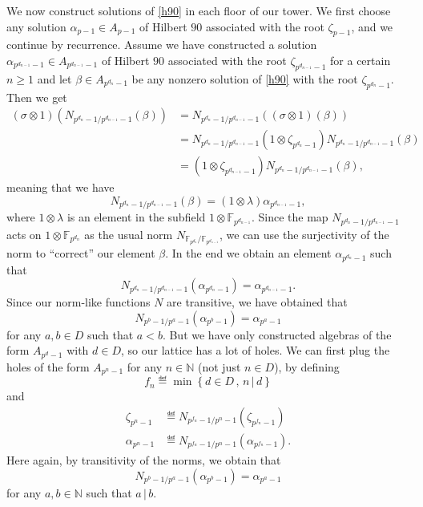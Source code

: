 \documentclass[a4paper,11pt]{article}
\begin{document}
We now construct solutions of \eqref{h90} in each floor of our
tower. We first choose any solution $\alpha_{p-1}\in A_{p-1}$ of Hilbert $90$
associated with the root $\zeta_{p-1}$, and we continue by recurrence. Assume we
have constructed a solution $\alpha_{p^{d_{n-1}}-1}\in A_{p^{d_{n-1}}-1}$ of
Hilbert $90$ associated with the root $\zeta_{p^{d_{n-1}}-1}$ for a certain
$n\geq1$ and let
$\beta\in A_{p^{d_n}-1}$ be any nonzero solution of \eqref{h90} with the root
$\zeta_{p^{d_n}-1}$.
Then we get
\begin{align*}
  (\sigma\otimes1)(N_{p^{d_n}-1/p^{d_{n-1}}-1}(\beta)) &= N_{p^{d_n}-1/p^{d_{n-1}}-1}((\sigma\otimes1)(\beta)) \\
  &= N_{p^{d_n}-1/p^{d_{n-1}}-1}(1\otimes\zeta_{p^{d_n}-1}) N_{p^{d_n}-1/p^{d_{n-1}}-1}(\beta) \\
  &= (1\otimes\zeta_{p^{d_{n-1}}-1})N_{p^{d_n}-1/p^{d_{n-1}}-1}(\beta),
\end{align*}
meaning that we have
\[
  N_{p^{d_n}-1/p^{d_{n-1}}-1}(\beta)=(1\otimes\lambda)\alpha_{p^{d_{n-1}}-1},
\]
where $1\otimes\lambda$ is an element in the subfield $1\otimes\mathbb{F}_{p^{d_{n-1}}}$. Since the map
$N_{p^{d_n}-1/p^{d_{n-1}}-1}$ acts on $1\otimes\mathbb{F}_{p^{d_n}}$ as the
usual norm $N_{\mathbb{F}_{p^{d_n}}/\mathbb{F}_{p^{d_{n-1}}}}$, we can use
the surjectivity of the norm to ``correct'' our element $\beta$. In the end we
obtain an element $\alpha_{p^{d_n}-1}$ such
that
\[
  N_{p^{d_n}-1/p^{d_{n-1}}-1}(\alpha_{p^{d_n}-1})=
  \alpha_{p^{d_{n-1}}-1}.
\]
Since our norm-like functions $N$ are transitive, we have obtained that 
\[
  N_{p^{b}-1/p^a-1}(\alpha_{p^b-1})=\alpha_{p^a-1}
\]
for any $a,b\in D$ such that $a<b$. But we have only constructed algebras of the form
$A_{p^d-1}$ with $d\in D$, so our lattice has a lot of holes. We can first plug
the holes of the form $A_{p^{n}-1}$ for any $n\in\mathbb{N}$ (not just $n\in
D$), by defining 
\[
  f_n \eqdef \min\left\{ d\in D\,,\,n\,|\,d \right\}
\]
and
\begin{align*}
  \zeta_{p^n-1}&\eqdef  N_{p^{f_n}-1/p^n-1}(\zeta_{p^{f_n}-1})\\
  \alpha_{p^n-1}&\eqdef
  N_{p^{f_n}-1/p^n-1}(\alpha_{p^{f_n}-1}).
\end{align*}
Here again, by transitivity of the norms, we obtain that
\[
  N_{p^{b}-1/p^a-1}(\alpha_{p^b-1})=\alpha_{p^a-1}
\]
for any $a,b\in\mathbb{N}$ such that $a\,|\,b$.
\end{document}
